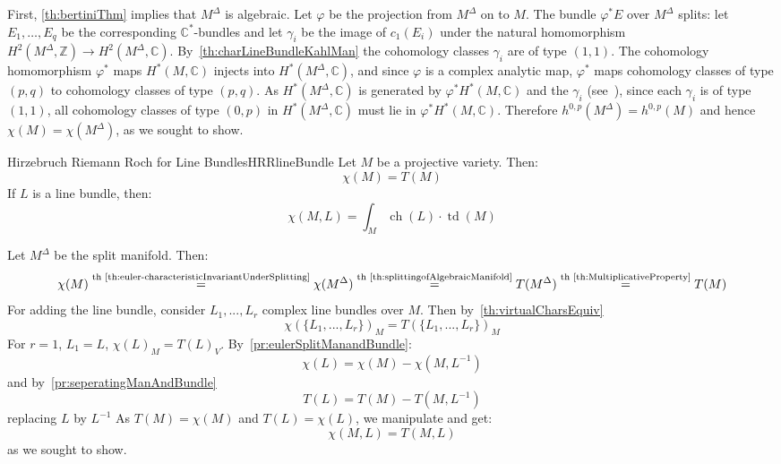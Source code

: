 \documentclass{book}
\newenvironment{Proof}[1][]
  {\begin{ProofTcb}[#1]}
  {\end{ProofTcb}}
\renewcommand{\phi}{\varphi}
\newcommand{\ch}{{\operatorname{ch}}}
\newcommand{\td}{{\operatorname{td}}}
\renewcommand{\ch}{{\operatorname{ch}}}
\begin{document}
\begin{Proof}
  First, \cref{th:bertiniThm} implies that $M^\Delta$ is algebraic. Let $\phi$ be the projection from
  $M^\Delta$ on to $M$. The bundle $\phi^* E$ over $M^\Delta$ splits: let $E_1,\ldots,E_q$ be the
  corresponding
  $\mathbb{C}^*$-bundles and let $\gamma_i$ be the image of $c_1(E_i)$ under the natural homomorphism
  $H^2(M^\Delta,\mathbb{Z}) \to H^2(M^\Delta,\mathbb{C})$. By~\cref{th:charLineBundleKahlMan} the cohomology classes $\gamma_i$ are of type $(1,1)$. The
  cohomology homomorphism $\phi^*$ maps $H^*(M,\mathbb{C})$ injects into $H^*(M^\Delta,\mathbb{C})$, and since $\phi$ is a complex analytic map, $\phi^*$ maps cohomology classes of type
  $(p,q)$ to cohomology classes of type $(p,q)$. As $H^*(M^\Delta,\mathbb{C})$ is generated by
  $\phi^* H^*(M,\mathbb{C})$ and the $\gamma_i$ (see~\cite{NateKTheory}), since each $\gamma_i$ is of type
  $(1,1)$, all cohomology classes of type $(0,p)$ in $H^*(M^\Delta,\mathbb{C})$ must lie in $\phi^*
  H^*(M,\mathbb{C})$. Therefore $h^{0,p}(M^\Delta) = h^{0,p}(M)$ and hence $\chi(M) = \chi(M^\Delta)$, as we
  sought to show.

\end{Proof}

\begin{thm}{Hirzebruch Riemann Roch for Line Bundles}{HRRlineBundle}
  Let $M$ be a projective variety. Then:
  \[
    \chi(M) = T(M)
  \]
  If $L$ is a line bundle, then:
  \[
    \chi(M,L) = \int_M \ch(L)\cdot \td(M)
  \]
\end{thm}

\begin{Proof}
  Let $M^\Delta$ be the split manifold. Then:
  \[
    \chi(M) \overset{\text{th~\ref{th:euler-characteristicInvariantUnderSplitting}}}{=} \chi(M^\Delta)
      \overset{\text{th~\ref{th:splittingofAlgebraicManifold}}}{=} T(M^\Delta)
      \overset{\text{th~\ref{th:MultiplicativeProperty}}}{=} T(M)
  \]
  For adding the line bundle, consider
  $L_1,..., L_r$ complex line bundles over $M$. Then by~\cref{th:virtualCharsEquiv}
  \[
    \chi(\{L_1, ..., L_r\})_M = T(\{L_1, ..., L_r\})_M
  \]
  For $r = 1$, $L_1 = L$, $\chi(L)_M = T(L)_V$. By~\cref{pr:eulerSplitManandBundle}:
  \[
  \chi(L) = \chi(M) - \chi(M,L^{-1})
\]
  and by~\cref{pr:seperatingManAndBundle}
\[
  T(L) = T(M) - T(M,L^{-1})
\]
  replacing $L$ by $L^{-1}$ As $T(M) = \chi(M)$ and $T(L) = \chi(L)$, we manipulate and get:
  \[
    \chi(M,L) = T(M,L)
  \]
as we sought to show.
\end{Proof}
\end{document}
